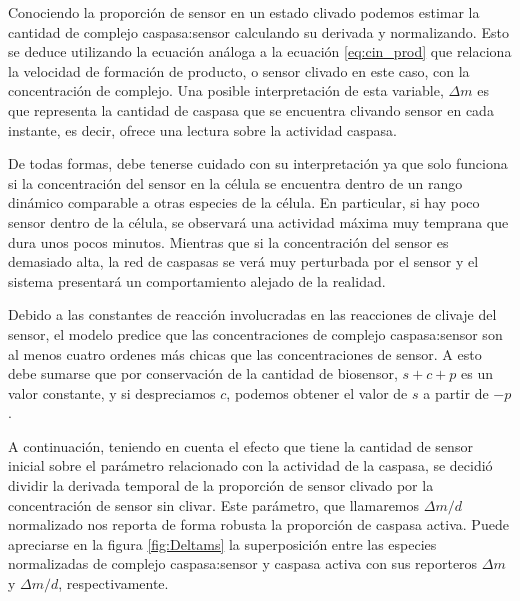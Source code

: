 Conociendo la proporción de sensor en un estado clivado podemos estimar la cantidad de complejo caspasa:sensor calculando su derivada y normalizando. Esto se deduce utilizando la ecuación análoga a la ecuación \ref{eq:cin_prod} que relaciona la velocidad de formación de producto, o sensor clivado en este caso, con la concentración de complejo. Una posible interpretación de esta variable, $\Delta m$ es que representa la cantidad de caspasa que se encuentra clivando sensor en cada instante, es decir, ofrece una lectura sobre la actividad caspasa. %

De todas formas, debe tenerse cuidado con su interpretación ya que solo funciona si la concentración del sensor en la célula se encuentra dentro de un rango dinámico comparable a otras especies de la célula. En particular, si hay poco sensor dentro de la célula, se observará una actividad máxima muy temprana que dura unos pocos minutos. Mientras que si la concentración del sensor es demasiado alta, la red de caspasas se verá muy perturbada por el sensor y el sistema presentará un comportamiento alejado de la realidad.

Debido a las constantes de reacción involucradas en las reacciones de clivaje del sensor, el modelo predice que las concentraciones de complejo caspasa:sensor son al menos cuatro ordenes más chicas que las concentraciones de sensor. A esto debe sumarse que por conservación de la cantidad de biosensor, $s+c+p$ es un valor constante, y si despreciamos $c$, podemos obtener el valor de $s$ a partir de $-p$.

A continuación, teniendo en cuenta el efecto que tiene la cantidad de sensor inicial sobre el parámetro relacionado con la actividad de la caspasa, se decidió dividir la derivada temporal de la proporción de sensor clivado por la concentración de sensor sin clivar. Este parámetro, que llamaremos $\Delta m/d$ normalizado nos reporta de forma robusta la proporción de caspasa activa. Puede apreciarse en la figura \ref{fig:Deltams} la superposición entre las especies normalizadas de complejo caspasa:sensor y caspasa activa con sus reporteros $\Delta m$ y $\Delta m/d$, respectivamente.

